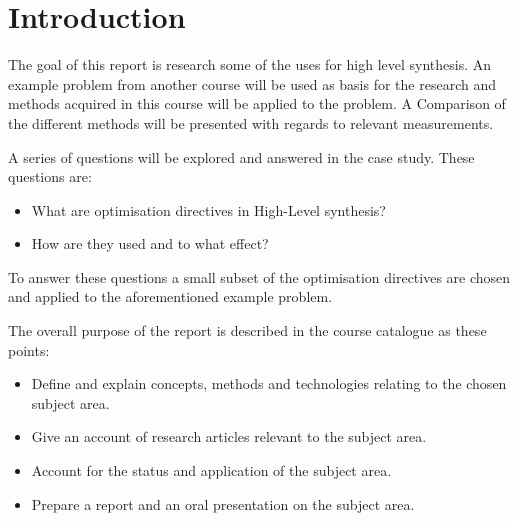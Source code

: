 \chapter{Introduction}
The goal of this report is research some of the uses for high level synthesis. An example problem from another course will be used as basis for the research and methods acquired in this course will be applied to the problem. A Comparison of the different methods will be presented with regards to relevant measurements.

A series of questions will be explored and answered in the case study. These questions are:
\begin{itemize}
\item What are optimisation directives in High-Level synthesis?
\item How are they used and to what effect?
\end{itemize}
To answer these questions a small subset of the optimisation directives are chosen and applied to the aforementioned example problem. 

The overall purpose of the report is described in the course catalogue as these points:
\begin{itemize}
\item Define and explain concepts, methods and technologies relating to the chosen subject area.
\item Give an account of research articles relevant to the subject area.
\item Account for the status and application of the subject area.
\item Prepare a report and an oral presentation on the subject area.
\end{itemize}
  